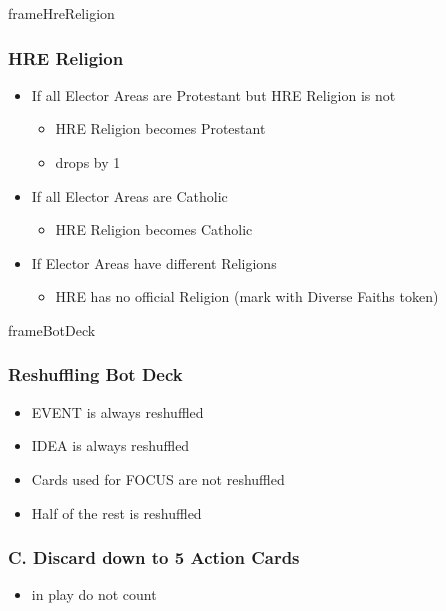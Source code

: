 \documentclass[10pt]{article}
\newlength{\fhHreReligion} \setlength\fhHreReligion{10\baselineskip}
\newlength{\fhBotDeck} \setlength\fhBotDeck{5\baselineskip}
\begin{document}
\begin{dynamiccontents*}{frameHreReligion}\begin{eubox}{\fhHreReligion}
	\subsubsection*{HRE Religion }
	\begin{itemize}
		\item If all Elector Areas are Protestant but HRE Religion is not
		\begin{itemize}
			\item HRE Religion becomes Protestant
			\item \authority drops by 1
		\end{itemize}
		\item If all Elector Areas are Catholic
		\begin{itemize}
			\item HRE Religion becomes Catholic
		\end{itemize}
		\item If Elector Areas have different Religions
		\begin{itemize}
			\item HRE has no official Religion (mark with Diverse Faiths token)
		\end{itemize}
	\end{itemize}
\end{eubox}\end{dynamiccontents*}
\begin{dynamiccontents*}{frameBotDeck}\begin{eubox}[botrulescolor]{\fhBotDeck}
	\botrules
	\subsubsection*{Reshuffling Bot Deck }
	\begin{itemize}
		\item EVENT is always reshuffled
		\item IDEA is always reshuffled
		\item Cards used for FOCUS are not reshuffled
		\item Half of the rest is reshuffled
	\end{itemize}
\end{eubox}\end{dynamiccontents*}

\subsubsection*{C. Discard down to 5 Action Cards}
\begin{itemize}
	\item \displaycard in play do not count
\end{itemize}
\end{document}
